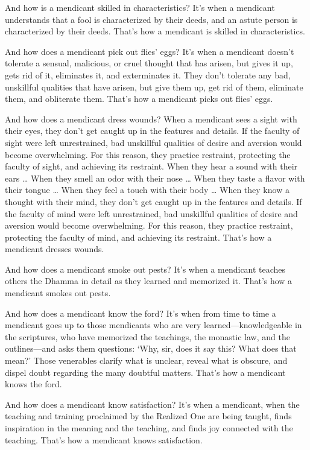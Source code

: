\documentclass[12pt,openany]{book}%
\begin{document}
And how is a mendicant skilled in characteristics? It’s when a mendicant understands that a fool is characterized by their deeds, and an astute person is characterized by their deeds. That’s how a mendicant is skilled in characteristics. 

And how does a mendicant pick out flies’ eggs? It’s when a mendicant doesn’t tolerate a sensual, malicious, or cruel thought that has arisen, but gives it up, gets rid of it, eliminates it, and exterminates it. They don’t tolerate any bad, unskillful qualities that have arisen, but give them up, get rid of them, eliminate them, and obliterate them. That’s how a mendicant picks out flies’ eggs. 

And how does a mendicant dress wounds? When a mendicant sees a sight with their eyes, they don’t get caught up in the features and details. If the faculty of sight were left unrestrained, bad unskillful qualities of desire and aversion would become overwhelming. For this reason, they practice restraint, protecting the faculty of sight, and achieving its restraint. When they hear a sound with their ears … When they smell an odor with their nose … When they taste a flavor with their tongue … When they feel a touch with their body … When they know a thought with their mind, they don’t get caught up in the features and details. If the faculty of mind were left unrestrained, bad unskillful qualities of desire and aversion would become overwhelming. For this reason, they practice restraint, protecting the faculty of mind, and achieving its restraint. That’s how a mendicant dresses wounds. 

And how does a mendicant smoke out pests? It’s when a mendicant teaches others the Dhamma in detail as they learned and memorized it. That’s how a mendicant smokes out pests. 

And how does a mendicant know the ford? It’s when from time to time a mendicant goes up to those mendicants who are very learned—knowledgeable in the scriptures, who have memorized the teachings, the monastic law, and the outlines—and asks them questions: ‘Why, sir, does it say this? What does that mean?’ Those venerables clarify what is unclear, reveal what is obscure, and dispel doubt regarding the many doubtful matters. That’s how a mendicant knows the ford. 

And how does a mendicant know satisfaction? It’s when a mendicant, when the teaching and training proclaimed by the Realized One are being taught, finds inspiration in the meaning and the teaching, and finds joy connected with the teaching. That’s how a mendicant knows satisfaction. 
\end{document}

